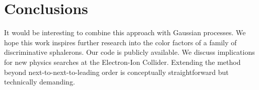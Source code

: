 \section{Conclusions}\label{sec:conclusions}

It would be interesting to combine this approach with Gaussian
processes. We hope this work inspires further research into the color
factors of a family of discriminative sphalerons. Our code is publicly
available. We discuss implications for new physics searches at the
Electron-Ion Collider. Extending the method beyond
next-to-next-to-leading order is conceptually straightforward but
technically demanding.

